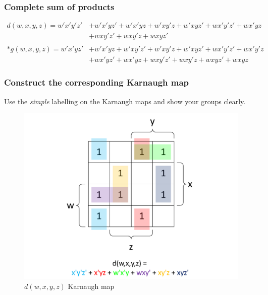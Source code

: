 \documentclass[12pt,a4paper]{article}
\begin{document}
\subsubsection{Complete sum of products}
\begin{align*}
d(w,x,y,z) = w'x'y'z' &+ w'x'yz' + w'x'yz + w'xy'z + w'xyz' + wx'y'z' + wx'yz \\
&+ wxy'z' + wxy'z + wxyz' \\
\\*
g(w,x,y,z) = w'x'yz' &+ w'x'yz + w'xy'z' + w'xy'z + w'xyz' + wx'y'z' + wx'y'z \\
&+ wx'yz' + wx'yz + wxy'z' + wxy'z + wxyz' + wxyz
\end{align*}

\newpage
\subsubsection{Construct the corresponding Karnaugh map}
Use the \emph{simple} labelling on the Karnaugh maps and show your groups clearly.

\begin{figure}[h]
\centering
\caption{$d(w,x,y,z)$ Karnaugh map}
\includegraphics[scale=0.56]{./../img/q5-2_d.pdf}
\end{figure}
\end{document}

